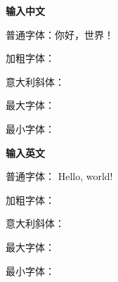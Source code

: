 \documentclass{ctexart}
\begin{document}
\textbf{输入中文}

普通字体：你好，世界！

加粗字体：

意大利斜体：

最大字体：

最小字体：

\textbf{输入英文}

普通字体： Hello, world!

加粗字体：

意大利斜体：

最大字体：

最小字体：
\end{document}
